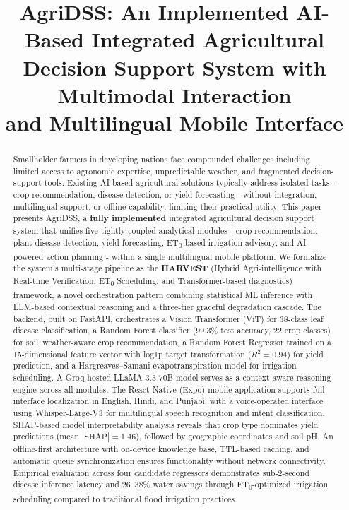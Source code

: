 \documentclass[conference]{IEEEtran}
\title{AgriDSS: An Implemented AI-Based Integrated Agricultural\\
Decision Support System with Multimodal Interaction\\
and Multilingual Mobile Interface}
\author{
\IEEEauthorblockN{Harish Saini\IEEEauthorrefmark{1}, Navya Bhumbak\IEEEauthorrefmark{1}, Bhavya Mittal\IEEEauthorrefmark{1}, Anisha Gupta\IEEEauthorrefmark{1}}
\IEEEauthorblockA{\IEEEauthorrefmark{1}University of Petroleum and Energy Studies (UPES), Dehradun, India\\
Email: \{harish.126796, Navya.120383, Bhavya.119005, anisha.28331\}@stu.upes.ac.in}
}
\begin{document}
\maketitle

\begin{abstract}
Smallholder farmers in developing nations face compounded challenges including limited access to agronomic expertise, unpredictable weather, and fragmented decision-support tools. Existing AI-based agricultural solutions typically address isolated tasks - crop recommendation, disease detection, or yield forecasting - without integration, multilingual support, or offline capability, limiting their practical utility. This paper presents AgriDSS, a \textbf{fully implemented} integrated agricultural decision support system that unifies five tightly coupled analytical modules - crop recommendation, plant disease detection, yield forecasting, ET\textsubscript{0}-based irrigation advisory, and AI-powered action planning - within a single multilingual mobile platform. We formalize the system's multi-stage pipeline as the \textbf{HARVEST} (Hybrid Agri-intelligence with Real-time Verification, ET\textsubscript{0} Scheduling, and Transformer-based diagnostics) framework, a novel orchestration pattern combining statistical ML inference with LLM-based contextual reasoning and a three-tier graceful degradation cascade. The backend, built on FastAPI, orchestrates a Vision Transformer (ViT) for 38-class leaf disease classification, a Random Forest classifier (99.3\% test accuracy, 22 crop classes) for soil--weather-aware crop recommendation, a Random Forest Regressor trained on a 15-dimensional feature vector with log1p target transformation ($R^2 = 0.94$) for yield prediction, and a Hargreaves--Samani evapotranspiration model for irrigation scheduling. A Groq-hosted LLaMA 3.3 70B model serves as a context-aware reasoning engine across all modules. The React Native (Expo) mobile application supports full interface localization in English, Hindi, and Punjabi, with a voice-operated interface using Whisper-Large-V3 for multilingual speech recognition and intent classification. SHAP-based model interpretability analysis reveals that crop type dominates yield predictions (mean $|\text{SHAP}| = 1.46$), followed by geographic coordinates and soil pH. An offline-first architecture with on-device knowledge base, TTL-based caching, and automatic queue synchronization ensures functionality without network connectivity. Empirical evaluation across four candidate regressors demonstrates sub-2-second disease inference latency and 26--38\% water savings through ET\textsubscript{0}-optimized irrigation scheduling compared to traditional flood irrigation practices.
\end{abstract}
\end{document}
